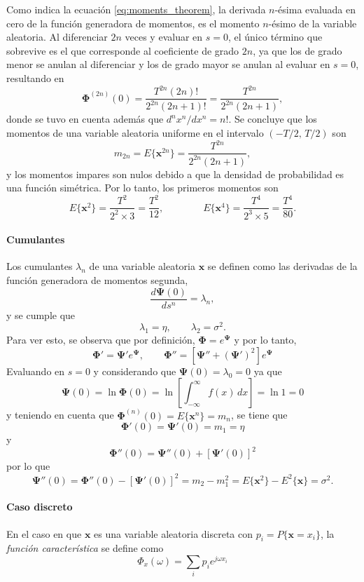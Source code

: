 \documentclass[a4paper]{report}
\newcommand{\x}{\mathbf{x}}
\newcommand{\Phibf}{\mathbf{\Phi}}
\newcommand{\Psibf}{\mathbf{\Psi}}
\begin{document}
Como indica la ecuación \ref{eq:moments_theorem}, la derivada \(n\)-ésima evaluada en cero de la función generadora de momentos, es el momento \(n\)-ésimo de la variable aleatoria. 
Al diferenciar \(2n\) veces y evaluar en \(s=0\), el único término que sobrevive es el que corresponde al coeficiente de grado \(2n\), ya que los de grado menor se anulan al diferenciar y los de grado mayor se anulan al evaluar en \(s=0\), resultando en
\[
  \Phibf^{(2n)}(0)=\frac{T^{2n}(2n)!}{2^{2n}(2n+1)!}=\frac{T^{2n}}{2^{2n}(2n+1)},
\]
donde se tuvo en cuenta además que \(d^nx^n/dx^n=n!\). Se concluye que los momentos de una variable aleatoria uniforme en el intervalo \((-T/2,\,T/2)\) son
\[
 m_{2n}=E\{\x^{2n}\}=\frac{T^{2n}}{2^{2n}(2n+1)},
\]
y los momentos impares son nulos debido a que la densidad de probabilidad es una función simétrica.
Por lo tanto, los primeros momentos son
\[
 E\{\x^2\}=\frac{T^2}{2^2\times3}=\frac{T^2}{12},\qquad\qquad E\{\x^4\}=\frac{T^4}{2^3\times5}=\frac{T^4}{80}.
\]



\paragraph{Cumulantes}

Los cumulantes \(\lambda_n\) de una variable aleatoria \(\x\) se definen como las derivadas de la función generadora de momentos segunda,
\[
 \frac{d\Psibf(0)}{ds^n}=\lambda_n,
\]
y se cumple que 
\[
 \lambda_1=\eta,\qquad\lambda_2=\sigma^2.
\]
Para ver esto, se observa que por definición, \(\Phibf=e^{\Psibf}\) y por lo tanto,
\[
 \Phibf'=\Psibf'e^{\Psibf},\qquad \Phibf''=\left[\Psibf''+\left(\Psibf'\right)^2\right]e^{\Psibf}
\]
Evaluando en \(s=0\) y considerando que \(\Psibf(0)=\lambda_0=0\) ya que
\[
 \Psibf(0)=\ln\Phibf(0)=\ln\left[\int_{-\infty}^{\infty}f(x)\,dx\right]=\ln1=0
\]
y teniendo en cuenta que \(\Phibf^{(n)}(0)=E\{\x^n\}=m_n\), se tiene que
\[
 \Phibf'(0)=\Psibf'(0)=m_1=\eta
\]
y
\[
 \Phibf''(0)=\Psibf''(0)+\left[\Psibf'(0)\right]^2
\]
por lo que
\[
 \Psibf''(0)=\Phibf''(0)-\left[\Psibf'(0)\right]^2=m_2-m_1^2=E\{\x^2\}-E^2\{\x\}=\sigma^2.
\]

\paragraph{Caso discreto} En el caso en que \(\x\) es una variable aleatoria discreta con \(p_i=P\{\x=x_i\}\), la \emph{función característica} se define como
\[
 \Phi_x(\omega)=\sum_i p_ie^{j\omega x_i}
\]
\end{document}
